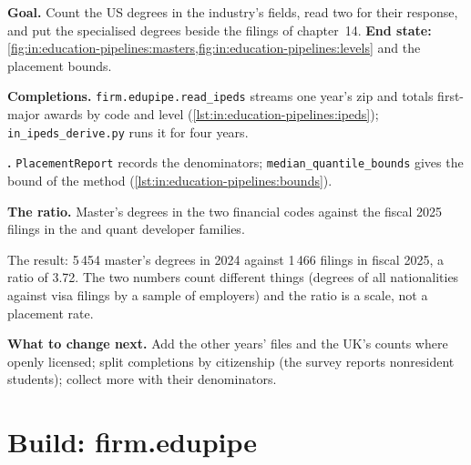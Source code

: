 \begin{tutorial}
\textbf{Goal.} Count the US degrees in the industry's fields, read two  for their response, and put
the specialised degrees beside the filings of chapter~14.
\textbf{End state:} \cref{fig:in:education-pipelines:masters,fig:in:education-pipelines:levels} and the placement bounds.
\begin{tutsteps}
\item \textbf{Completions.} \texttt{firm.edupipe.read\_ipeds} streams one year's zip and totals first-major awards by code
and level (\cref{lst:in:education-pipelines:ipeds}); \texttt{in\_ipeds\_derive.py} runs it for four years.
\label{lst:in:education-pipelines:ipeds}
\item \textbf{.} \texttt{PlacementReport} records the denominators; \texttt{median\_quantile\_bounds}
gives the bound of the method (\cref{lst:in:education-pipelines:bounds}).
\label{lst:in:education-pipelines:bounds}
\item \textbf{The ratio.} Master's degrees in the two financial codes against the fiscal 2025 filings in the
 and quant developer families.
\end{tutsteps}
\end{tutorial}

The result: 5\,454 master's degrees in 2024 against 1\,466 filings in fiscal 2025, a ratio of 3.72. The two numbers
count different things (degrees of all nationalities against visa filings by a sample of employers) and the ratio is a
scale, not a placement rate.

\textbf{What to change next.} Add the other years' files and the UK's counts where openly licensed; split completions
by citizenship (the survey reports nonresident students); collect more  with their denominators.

\section{Build: firm.edupipe}\label{bld:in:education-pipelines:edupipe}

